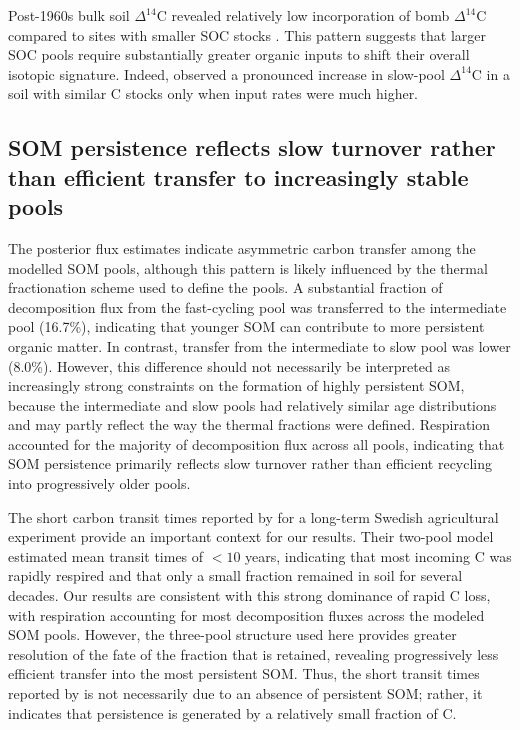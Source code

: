 \documentclass[bg, manuscript]{copernicus}
\begin{document}
Post-1960s bulk soil $\Delta^{14}\text{C}$ revealed relatively low incorporation of bomb $\Delta^{14}\text{C}$ compared to sites with smaller SOC stocks \citep{Baisden2013, Stoner2021}. This pattern suggests that larger SOC pools require substantially greater organic inputs to shift their overall isotopic signature. Indeed, \citet{Mills2014} observed a pronounced increase in slow-pool $\Delta^{14}\text{C}$ in a soil with similar C stocks only when input rates were much higher. 

\subsection{SOM persistence reflects slow turnover rather than efficient transfer to increasingly stable pools}
The posterior flux estimates indicate asymmetric carbon transfer among the modelled SOM pools, although this pattern is likely influenced by the thermal fractionation scheme used to define the pools. A substantial fraction of decomposition flux from the fast-cycling pool was transferred to the intermediate pool (16.7\%), indicating that younger SOM can contribute to more persistent organic matter. In contrast, transfer from the intermediate to slow pool was lower (8.0\%). However, this difference should not necessarily be interpreted as increasingly strong constraints on the formation of highly persistent SOM, because the intermediate and slow pools had relatively similar age distributions and may partly reflect the way the thermal fractions were defined. Respiration accounted for the majority of decomposition flux across all pools, indicating that SOM persistence primarily reflects slow turnover rather than efficient recycling into progressively older pools.

The short carbon transit times reported by \citet{Spohn2023} for a long-term Swedish agricultural experiment provide an important context for our results. Their two-pool model estimated mean transit times of $< 10$ years, indicating that most incoming C was rapidly respired and that only a small fraction remained in soil for several decades. Our results are consistent with this strong dominance of rapid C loss, with respiration accounting for most decomposition fluxes across the modeled SOM pools. However, the three-pool structure used here provides greater resolution of the fate of the fraction that is retained, revealing progressively less efficient transfer into the most persistent SOM. Thus, the short transit times reported by \citet{Spohn2023} is not necessarily due to an absence of persistent SOM; rather, it indicates that persistence is generated by a relatively small fraction of C.
\end{document}
